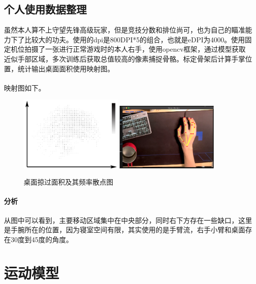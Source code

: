 \documentclass[UTF8]{ctexart}
\begin{document}
\subsection{个人使用数据整理}
    虽然本人算不上守望先锋高级玩家，但是竞技分数和排位尚可，也为自己的瞄准能力下了比较大的功夫。使用的dpi是800DPI*5的组合，也就是eDPI为4000。使用固定机位拍摄了一张进行正常游戏时的本人右手，使用opencv框架，通过模型获取近似手部区域，多次训练后获取总值较高的像素捕捉骨骼。标定骨架后计算手掌位置，统计输出桌面面积使用映射图。
\paragraph{}映射图如下。
    \begin{figure}[htbp]
        \centering
        \includegraphics[width=0.45\textwidth]{point.png}
        \includegraphics[width=0.45\textwidth]{test.png}
        \caption{桌面掠过面积及其频率散点图}
    \end{figure}
    \paragraph{分析}
    从图中可以看到，主要移动区域集中在中央部分，同时右下方存在一些缺口，这里是手腕所在的位置，因为寝室空间有限，其实使用的是手臂流，右手小臂和桌面存在30度到45度的角度。

\newpage
\section{运动模型}
\end{document}
